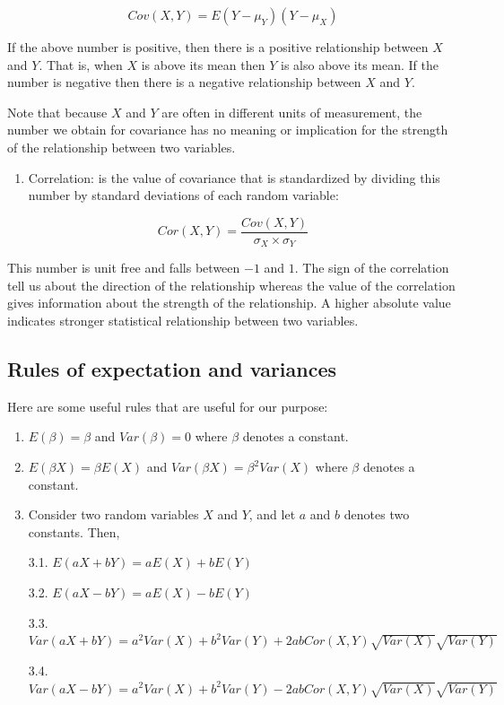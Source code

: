 \documentclass[]{book}
\providecommand{\tightlist}{%
  \setlength{\itemsep}{0pt}\setlength{\parskip}{0pt}}
\theoremstyle{definition}
\theoremstyle{definition}
\theoremstyle{definition}
\theoremstyle{remark}
\begin{document}
\[Cov(X,Y) = E(Y-\mu_Y)(Y-\mu_X)\]

If the above number is positive, then there is a positive relationship between \(X\) and \(Y\). That is, when \(X\) is above its mean then \(Y\) is also above its mean. If the number is negative then there is a negative relationship between \(X\) and \(Y\).

Note that because \(X\) and \(Y\) are often in different units of measurement, the number we obtain for covariance has no meaning or implication for the strength of the relationship between two variables.

\begin{enumerate}
\def\labelenumi{\arabic{enumi}.}
\setcounter{enumi}{1}
\tightlist
\item
  Correlation: is the value of covariance that is standardized by dividing this number by standard deviations of each random variable:
\end{enumerate}

\[Cor(X,Y) = \frac{Cov(X,Y)}{\sigma_X \times \sigma_Y }\]

This number is unit free and falls between \(-1\) and \(1\). The sign of the correlation tell us about the direction of the relationship whereas the value of the correlation gives information about the strength of the relationship. A higher absolute value indicates stronger statistical relationship between two variables.

\hypertarget{rules-of-expectation-and-variances}{%
\subsection{Rules of expectation and variances}\label{rules-of-expectation-and-variances}}

Here are some useful rules that are useful for our purpose:

\begin{enumerate}
\def\labelenumi{\arabic{enumi}.}
\item
  \(E(\beta)=\beta\) and \(Var(\beta)=0\) where \(\beta\) denotes a constant.
\item
  \(E(\beta X)= \beta E(X)\) and \(Var(\beta X)= \beta^2 Var(X)\) where \(\beta\) denotes a constant.
\item
  Consider two random variables \(X\) and \(Y\), and let \(a\) and \(b\) denotes two constants. Then,

  3.1. \(E(aX+bY)=aE(X)+bE(Y)\)

  3.2. \(E(aX-bY)=aE(X)-bE(Y)\)

  3.3. \(Var(aX+bY)=a^2 Var(X)+b^2 Var(Y)+2abCor(X,Y)\sqrt{Var(X)}\sqrt{Var(Y)}\)

  3.4. \(Var(aX-bY)=a^ 2Var(X)+b^2 Var(Y)-2abCor(X,Y)\sqrt{Var(X)}\sqrt{Var(Y)}\)
\end{enumerate}
\end{document}
